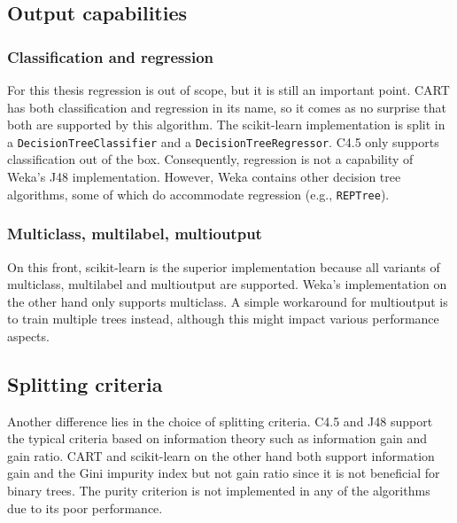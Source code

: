
\subsection{Output capabilities}
\subsubsection{Classification and regression}
For this thesis regression is out of scope, but it is still an important point. CART has both classification and regression in its name, so it comes as no surprise that both are supported by this algorithm. The scikit-learn implementation is split in a \texttt{DecisionTreeClassifier} and a \texttt{DecisionTreeRegressor}. C4.5 only supports classification out of the box. Consequently, regression is not a capability of Weka's J48 implementation. However, Weka contains other decision tree algorithms, some of which do accommodate regression (e.g., \texttt{REPTree}).

\subsubsection{Multiclass, multilabel, multioutput}
On this front, scikit-learn is the superior implementation because all variants of multiclass, multilabel and multioutput are supported. Weka's implementation on the other hand only supports multiclass. A simple workaround for multioutput is to train multiple trees instead, although this might impact various performance aspects.


\subsection{Splitting criteria}
Another difference lies in the choice of splitting criteria. C4.5 and J48 support the typical criteria based on information theory such as information gain and gain ratio. CART and scikit-learn on the other hand both support information gain and the Gini impurity index but not gain ratio since it is not beneficial for binary trees. The purity criterion is not implemented in any of the algorithms due to its poor performance.

